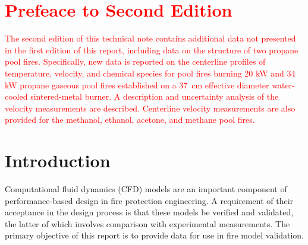\documentclass[12pt]{article}
\begin{document}
\begin{multicols}{2} 
\printnomenclature
\end{multicols}
\clearpage
\section*{\textcolor{red}{Prefeace to Second Edition}}
\textcolor{red}{The second edition of this technical note contains additional data not presented in the first edition of this report, including data on the structure of two propane pool fires. Specifically, new data is reported on the centerline profiles of temperature, velocity, and chemical species for pool fires burning 20 kW and 34 kW propane gaseous pool fires established on a 37~cm effective diameter water-cooled sintered-metal burner. A description and uncertainty analysis of the velocity measurements are described. Centerline velocity measurements are also provided for the methanol, ethanol, acetone, and methane pool fires.}

\clearpage

\section{Introduction}
\label{sec:intro}
Computational fluid dynamics (CFD) models are an important component of performance-based design in fire protection engineering. A requirement of their acceptance in the design process is that these models be verified and validated, the latter of which involves comparison with experimental measurements. The primary objective of this report is to provide data for use in fire model validation.
\end{document}
